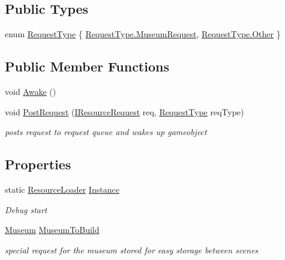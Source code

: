 \subsection*{Public Types}
\begin{DoxyCompactItemize}
\item 
enum \mbox{\hyperlink{class_resource_loader_a55469e5c9294ec83732bfa4e2c3135ab}{Request\+Type}} \{ \mbox{\hyperlink{class_resource_loader_a55469e5c9294ec83732bfa4e2c3135abae9bfe9055aff7833d2f507392005faef}{Request\+Type.\+Museum\+Request}}, 
\mbox{\hyperlink{class_resource_loader_a55469e5c9294ec83732bfa4e2c3135aba6311ae17c1ee52b36e68aaf4ad066387}{Request\+Type.\+Other}}
 \}
\end{DoxyCompactItemize}
\subsection*{Public Member Functions}
\begin{DoxyCompactItemize}
\item 
void \mbox{\hyperlink{class_resource_loader_ad258acc6c5c963d5ca93dbe36e243d20}{Awake}} ()
\item 
void \mbox{\hyperlink{class_resource_loader_abcaa27712f43f305baef3df7722c9e73}{Post\+Request}} (\mbox{\hyperlink{interface_i_resource_request}{I\+Resource\+Request}} req, \mbox{\hyperlink{class_resource_loader_a55469e5c9294ec83732bfa4e2c3135ab}{Request\+Type}} req\+Type)
\begin{DoxyCompactList}\small\item\em posts request to request queue and wakes up gameobject \end{DoxyCompactList}\end{DoxyCompactItemize}
\subsection*{Properties}
\begin{DoxyCompactItemize}
\item 
static \mbox{\hyperlink{class_resource_loader}{Resource\+Loader}} \mbox{\hyperlink{class_resource_loader_a66d4b7f32938dad50d13f48e362b7b76}{Instance}}
\begin{DoxyCompactList}\small\item\em Debug start \end{DoxyCompactList}\item 
\mbox{\hyperlink{class_museum}{Museum}} \mbox{\hyperlink{class_resource_loader_ade4e93d50757ee75b2356a663c7fd3cd}{Museum\+To\+Build}}
\begin{DoxyCompactList}\small\item\em special request for the museum stored for easy storage between scenes \end{DoxyCompactList}\end{DoxyCompactItemize}
